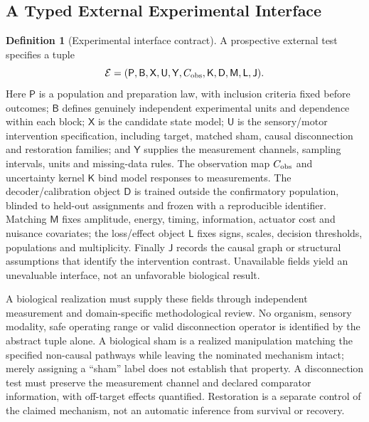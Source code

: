 \documentclass[11pt,a4paper]{article}
\theoremstyle{definition}
\newtheorem{definition}[theorem]{Definition}
\begin{document}
\subsection{A Typed External Experimental Interface}\label{sec:external-interface-contract}

\begin{definition}[Experimental interface contract]\label{def:external-experimental-interface}
A prospective external test specifies a tuple
\[
 \mathcal E=(\mathsf P,\mathsf B,\mathsf X,\mathsf U,\mathsf Y,
 C_{\rm obs},\mathsf K,\mathsf D,\mathsf M,\mathsf L,\mathsf J).
\]
Here $\mathsf P$ is a population and preparation law, with inclusion criteria fixed before outcomes; $\mathsf B$ defines genuinely independent experimental units and dependence within each block; $\mathsf X$ is the candidate state model; $\mathsf U$ is the sensory/motor intervention specification, including target, matched sham, causal disconnection and restoration families; and $\mathsf Y$ supplies the measurement channels, sampling intervals, units and missing-data rules. The observation map $C_{\rm obs}$ and uncertainty kernel $\mathsf K$ bind model responses to measurements. The decoder/calibration object $\mathsf D$ is trained outside the confirmatory population, blinded to held-out assignments and frozen with a reproducible identifier. Matching $\mathsf M$ fixes amplitude, energy, timing, information, actuator cost and nuisance covariates; the loss/effect object $\mathsf L$ fixes signs, scales, decision thresholds, populations and multiplicity. Finally $\mathsf J$ records the causal graph or structural assumptions that identify the intervention contrast. Unavailable fields yield an unevaluable interface, not an unfavorable biological result.

A biological realization must supply these fields through independent measurement and domain-specific methodological review. No organism, sensory modality, safe operating range or valid disconnection operator is identified by the abstract tuple alone. A biological sham is a realized manipulation matching the specified non-causal pathways while leaving the nominated mechanism intact; merely assigning a ``sham'' label does not establish that property. A disconnection test must preserve the measurement channel and declared comparator information, with off-target effects quantified. Restoration is a separate control of the claimed mechanism, not an automatic inference from survival or recovery.
\end{definition}
\end{document}
